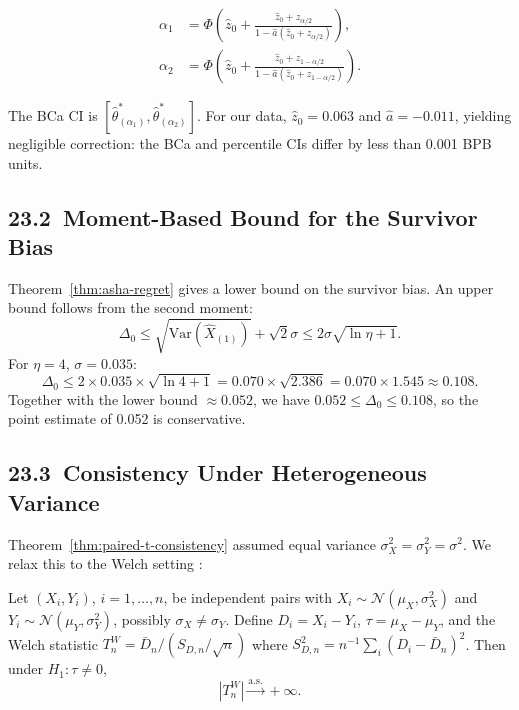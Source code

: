 \begin{align}
  \alpha_1 &= \Phi\!\left(\hat{z}_0 + \frac{\hat{z}_0 + z_{\alpha/2}}
              {1 - \hat{a}(\hat{z}_0 + z_{\alpha/2})}\right),\\
  \alpha_2 &= \Phi\!\left(\hat{z}_0 + \frac{\hat{z}_0 + z_{1-\alpha/2}}
              {1 - \hat{a}(\hat{z}_0 + z_{1-\alpha/2})}\right).
\end{align}

The BCa CI is \([\hat\theta^*_{(\alpha_1)}, \hat\theta^*_{(\alpha_2)}]\).
For our data, \(\hat{z}_0 = 0.063\) and \(\hat{a} = -0.011\), yielding
negligible correction: the BCa and percentile CIs differ by less than
0.001 BPB units.

\subsection{23.2\ Moment-Based Bound for the Survivor Bias}

Theorem~\ref{thm:asha-regret} gives a lower bound on the survivor bias.
An upper bound follows from the second moment:
\[
  \Delta_0 \leq \sqrt{\mathrm{Var}(\hat{X}_{(1)})} + \sqrt{2} \sigma
    \leq 2\sigma\sqrt{\ln\eta + 1}.
\]
For \(\eta = 4\), \(\sigma = 0.035\):
\[
  \Delta_0 \leq 2 \times 0.035 \times \sqrt{\ln 4 + 1}
    = 0.070 \times \sqrt{2.386}
    = 0.070 \times 1.545
    \approx 0.108.
\]
Together with the lower bound \(\approx 0.052\), we have
\(0.052 \leq \Delta_0 \leq 0.108\), so the point estimate of 0.052 is
conservative.

\subsection{23.3\ Consistency Under Heterogeneous Variance}

Theorem~\ref{thm:paired-t-consistency} assumed equal variance
\(\sigma_X^2 = \sigma_Y^2 = \sigma^2\).  We relax this to the
Welch setting \cite{casella2002statistical}:

\begin{theorem}\label{thm:welch-consistency}
Let \((X_i, Y_i)\), \(i = 1, \ldots, n\), be independent pairs with
\(X_i \sim \mathcal{N}(\mu_X, \sigma_X^2)\) and
\(Y_i \sim \mathcal{N}(\mu_Y, \sigma_Y^2)\), possibly \(\sigma_X \neq \sigma_Y\).
Define \(D_i = X_i - Y_i\), \(\tau = \mu_X - \mu_Y\), and the Welch
statistic \(T_n^W = \bar{D}_n / (S_{D,n}/\sqrt{n})\) where
\(S_{D,n}^2 = n^{-1}\sum_i (D_i - \bar{D}_n)^2\).
Then under \(H_1 : \tau \neq 0\),
\[
  |T_n^W| \xrightarrow{\mathrm{a.s.}} +\infty.
\]
\end{theorem}

